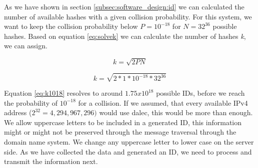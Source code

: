      As we have shown in section \ref{subsec:software_design:id} we can calculated the number of available hashes with a given collision probability. For this system, we want to keep the collision probability below $P = 10^{-18}$ for $N = 32^{36}$ possible hashes.
     Based on equation \ref{eq:solvek} we can calculate the number of hashes \textit{k}, we can assign.
     
     \begin{equation*}
         k = \sqrt{2PN}
     \end{equation*}
     
     \begin{equation}
        \label{eq:k1018}
         k = \sqrt{2 * 1 * 10^{-18} * 32^{36}}
     \end{equation}
     
     Equation \ref{eq:k1018} resolves to around $1.75x10^{18}$ possible IDs, before we reach the probability of $10^{-18}$ for a collision. If we assumed, that every available IPv4 address ($2^{32} = 4,294,967,296)$ would use dalec, this would be more than enough.\\
     
     We allow uppercase letters to be included in a generated ID, this information might or might not be preserved through the message traversal through the domain name system. We change any uppercase letter to lower case on the server side. 
     As we have collected the data and generated an ID, we need to process and transmit the information next.
     
     
% 
